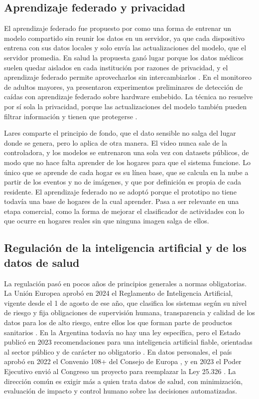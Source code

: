 \subsection{Aprendizaje federado y privacidad}

El aprendizaje federado fue propuesto por \textcite{McMahan2017} como una forma de entrenar un modelo compartido sin reunir los datos en un servidor, ya que cada dispositivo entrena con sus datos locales y solo envía las actualizaciones del modelo, que el servidor promedia.
En salud la propuesta ganó lugar porque los datos médicos suelen quedar aislados en cada institución por razones de privacidad, y el aprendizaje federado permite aprovecharlos sin intercambiarlos \parencite{Rieke2020}.
En el monitoreo de adultos mayores, \textcite{Shao2025} ya presentaron experimentos preliminares de detección de caídas con aprendizaje federado sobre hardware embebido.
La técnica no resuelve por sí sola la privacidad, porque las actualizaciones del modelo también pueden filtrar información y tienen que protegerse \parencite{Rieke2020}.

Lares comparte el principio de fondo, que el dato sensible no salga del lugar donde se genera, pero lo aplica de otra manera.
El video nunca sale de la controladora, y los modelos se entrenaron una sola vez con datasets públicos, de modo que no hace falta aprender de los hogares para que el sistema funcione.
Lo único que se aprende de cada hogar es su línea base, que se calcula en la nube a partir de los eventos y no de imágenes, y que por definición es propia de cada residente.
El aprendizaje federado no se adoptó porque el prototipo no tiene todavía una base de hogares de la cual aprender.
Pasa a ser relevante en una etapa comercial, como la forma de mejorar el clasificador de actividades con lo que ocurre en hogares reales sin que ninguna imagen salga de ellos.

\subsection{Regulación de la inteligencia artificial y de los datos de salud}

La regulación pasó en pocos años de principios generales a normas obligatorias.
La Unión Europea aprobó en 2024 el Reglamento de Inteligencia Artificial, vigente desde el 1 de agosto de ese año, que clasifica los sistemas según su nivel de riesgo y fija obligaciones de supervisión humana, transparencia y calidad de los datos para los de alto riesgo, entre ellos los que forman parte de productos sanitarios \parencite{UE2024}.
En la Argentina todavía no hay una ley específica, pero el Estado publicó en 2023 recomendaciones para una inteligencia artificial fiable, orientadas al sector público y de carácter no obligatorio \parencite{Argentina2023IA}.
En datos personales, el país aprobó en 2022 el Convenio 108+ del Consejo de Europa \parencite{Argentina2022}, y en 2023 el Poder Ejecutivo envió al Congreso un proyecto para reemplazar la Ley 25.326 \parencite{Argentina2023PDP}.
La dirección común es exigir más a quien trata datos de salud, con minimización, evaluación de impacto y control humano sobre las decisiones automatizadas.

